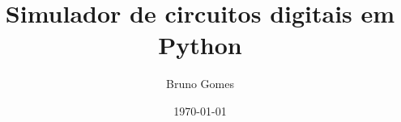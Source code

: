 \documentclass[12pt]{article}
\begin{document}
\title{Simulador de circuitos digitais em Python}
\author{Bruno Gomes}
\date{\today}
\maketitle






\printbibliography
\end{document}
